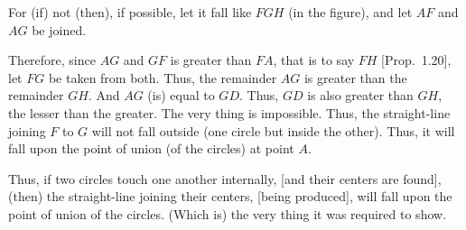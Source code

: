 \begin{Parallel}{}{}
{For (if) not (then), if possible, let it fall like $FGH$ (in the figure), and
let $AF$ and $AG$ be joined.

Therefore, since $AG$ and $GF$ is greater than $FA$, that is to
say $FH$ [Prop.~1.20], let $FG$ be taken from both.
Thus, the remainder $AG$ is greater than the remainder $GH$.
And $AG$ (is) equal to $GD$. Thus, $GD$ is also greater than $GH$, the lesser
than the greater. The very thing is impossible. Thus, the straight-line
joining $F$ to $G$ will not fall outside (one circle but inside the other). Thus, it will fall upon the point of
union (of the circles) at point $A$. 

\epsfysize=2.2in
\centerline{}

Thus, if two circles  touch one another internally, [and their
centers are found], (then)  the straight-line joining their
centers, [being produced], will fall upon the point of union of
the circles. (Which is) the very thing it was required to show.}
\end{Parallel}

